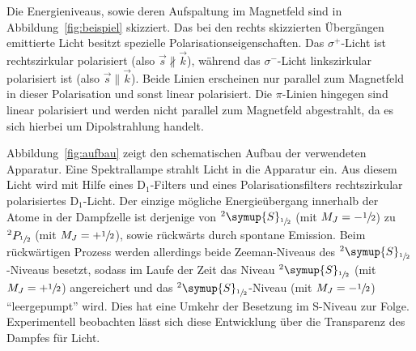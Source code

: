 Die Energieniveaus, sowie deren Aufspaltung im Magnetfeld sind in
Abbildung~\ref{fig:beispiel} skizziert. Das bei den rechts skizzierten
Übergängen emittierte Licht besitzt spezielle Polarisationseigenschaften. Das
$\sigma^+$-Licht ist rechtszirkular polarisiert (also
$\vec{s}\nparallel\vec{k}$), während das $\sigma^-$-Licht linkszirkular
polarisiert ist (also $\vec{s}\parallel\vec{k}$). Beide Linien erscheinen nur
parallel zum Magnetfeld in dieser Polarisation und sonst linear polarisiert.
Die $\pi$-Linien hingegen sind linear polarisiert und werden nicht parallel zum
Magnetfeld abgestrahlt, da es sich hierbei um Dipolstrahlung handelt.
%

Abbildung~\ref{fig:aufbau} zeigt den schematischen Aufbau der verwendeten
Apparatur. Eine Spektrallampe strahlt Licht in die Apparatur ein. Aus diesem
Licht wird mit Hilfe eines $\text{D}_1$-Filters und eines Polarisationsfilters
rechtszirkular polarisiertes $\text{D}_1$-Licht. Der einzige mögliche
Energieübergang innerhalb der Atome in der Dampfzelle ist derjenige von
$^2\symup{S}_{\sfrac{1}{2}}$ (mit $M_J=-\sfrac{1}{2}$) zu
$^2P_{\sfrac{1}{2}}$ (mit $M_J=+\sfrac{1}{2}$), sowie rückwärts durch
spontane Emission. Beim rückwärtigen Prozess werden allerdings beide
Zeeman-Niveaus des $^2\symup{S}_{\sfrac{1}{2}}$-Niveaus besetzt, sodass im
Laufe der Zeit das Niveau $^2\symup{S}_{\sfrac{1}{2}}$ (mit
$M_J=+\sfrac{1}{2}$) angereichert und das
$^2\symup{S}_{\sfrac{1}{2}}$-Niveau (mit $M_J=-\sfrac{1}{2}$)
\enquote{leergepumpt} wird. Dies hat eine Umkehr der Besetzung im S-Niveau zur
Folge. Experimentell beobachten lässt sich diese Entwicklung über die
Transparenz des Dampfes für Licht.
%

